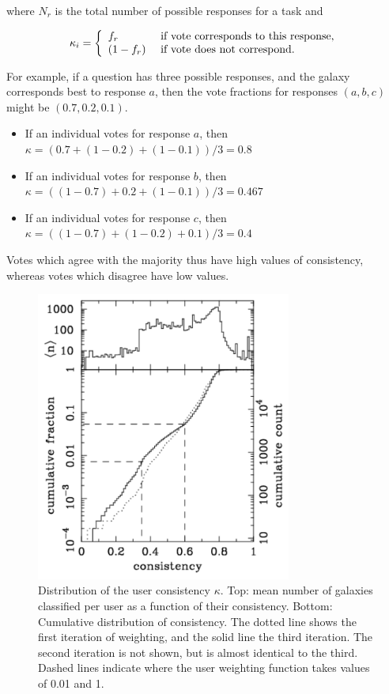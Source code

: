 \documentclass[useAMS,usenatbib]{mn2e}
\begin{document}
\noindent where $N_r$ is the total number of possible responses for a task and

\begin{equation}
    \kappa_i = \left\{
    \begin{array}{l l}
      f_r       & \text{ if vote corresponds to this response,} \\
      (1 - f_r) & \text{ if vote does not correspond.}\\
    \end{array} \right.
    \label{eqn-consistency2}
 \end{equation}

For example, if a question has three possible responses, and the galaxy corresponds best to response $a$, then the vote fractions for responses $(a, b, c)$ might be $(0.7, 0.2, 0.1)$.
\begin{itemize}
\item If an individual votes for response $a$, then \\$\kappa = (0.7 + (1-0.2) + (1-0.1))/3 = 0.8$
\item If an individual votes for response $b$, then \\$\kappa = ((1-0.7) + 0.2 + (1-0.1))/3 = 0.467$
\item If an individual votes for response $c$, then \\$\kappa = ((1-0.7) + (1-0.2) + 0.1)/3 = 0.4$
\end{itemize}
\noindent Votes which agree with the majority thus have high values of consistency, whereas votes which disagree have low values.

\begin{figure}
\includegraphics[angle=0,width=3.3in]{figures/user_consistency.pdf}
\caption{Distribution of the user consistency $\kappa$. Top: mean number of galaxies classified per user as a function of their consistency. Bottom: Cumulative distribution of consistency. The dotted line shows the first iteration of weighting, and the solid line the third iteration. The second iteration is not shown, but is almost identical to the third. Dashed lines indicate where the user weighting function takes values of 0.01 and 1. 
\label{fig-consistency}}
\end{figure}
\end{document}
